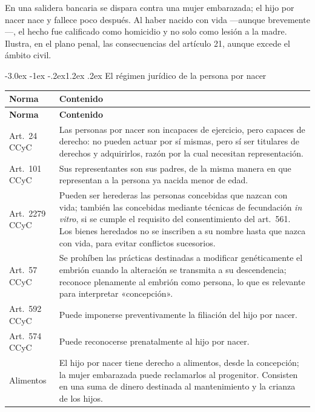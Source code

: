 \documentclass[12pt,oneside]{book}
\makeatletter
\renewcommand\section{\@startsection{section}{1}{\z@}%
  {-3.0ex \@plus -1ex \@minus -.2ex}{1.2ex \@plus .2ex}%
  {\normalfont\large\bfseries\color{acento}}}
\makeatother
\begin{document}
\begin{ejemplo}
En una salidera bancaria se dispara contra una mujer embarazada; el hijo por nacer nace y fallece poco después. Al haber nacido con vida ---aunque brevemente---, el hecho fue calificado como homicidio y no solo como lesión a la madre. Ilustra, en el plano penal, las consecuencias del artículo 21, aunque excede el ámbito civil.
\end{ejemplo}

\section{El régimen jurídico de la persona por nacer}

\begin{longtable}{@{}B{0.20\textwidth}L{0.70\textwidth}@{}}
\toprule
\textbf{Norma} & \textbf{Contenido} \\
\midrule
\endfirsthead
\toprule
\textbf{Norma} & \textbf{Contenido} \\
\midrule
\endhead
\bottomrule
\endfoot
Art.~24 CCyC & Las personas por nacer son incapaces de ejercicio, pero capaces de derecho: no pueden actuar por sí mismas, pero sí ser titulares de derechos y adquirirlos, razón por la cual necesitan representación. \\
Art.~101 CCyC & Sus representantes son sus padres, de la misma manera en que representan a la persona ya nacida menor de edad. \\
Art.~2279 CCyC & Pueden ser herederas las personas concebidas que nazcan con vida; también las concebidas mediante técnicas de fecundación \textit{in vitro}, si se cumple el requisito del consentimiento del art.~561. Los bienes heredados no se inscriben a su nombre hasta que nazca con vida, para evitar conflictos sucesorios. \\
Art.~57 CCyC & Se prohíben las prácticas destinadas a modificar genéticamente el embrión cuando la alteración se transmita a su descendencia; reconoce plenamente al embrión como persona, lo que es relevante para interpretar «concepción». \\
Art.~592 CCyC & Puede imponerse preventivamente la filiación del hijo por nacer. \\
Art.~574 CCyC & Puede reconocerse prenatalmente al hijo por nacer. \\
Alimentos & El hijo por nacer tiene derecho a alimentos, desde la concepción; la mujer embarazada puede reclamarlos al progenitor. Consisten en una suma de dinero destinada al mantenimiento y la crianza de los hijos. \\
\end{longtable}
\end{document}
